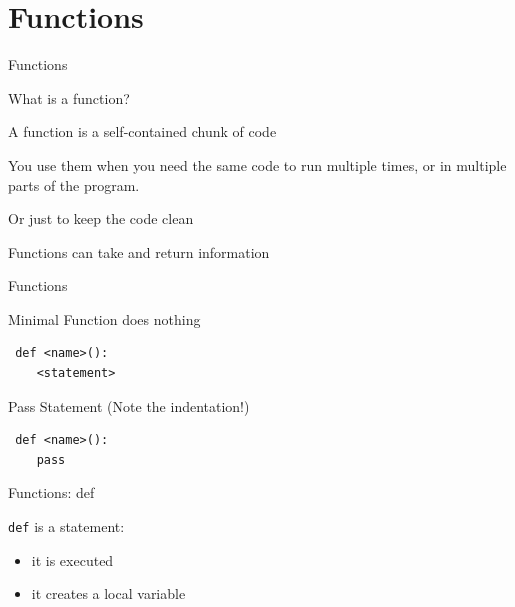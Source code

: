 \documentclass{beamer}
\begin{document}
\section{Functions}

\begin{frame}[fragile]{Functions}

\vfill
{\Large What is a function?}

\vfill
{\large A function is a self-contained chunk of code}

\vfill
{\large You use them when you need the same code to run multiple times,
or in multiple parts of the program.}

\hspace{1in}{\Large (DRY) }

\vfill
{\large Or just to keep the code clean}

\vfill
{\large Functions can take and return information}

\end{frame}


\begin{frame}[fragile]{Functions}

{\Large Minimal Function does nothing}

\begin{verbatim}
￼def <name>():
    <statement>
\end{verbatim}

\vspace{0.25in}
{\Large Pass Statement (Note the indentation!)}
\begin{verbatim}
￼def <name>():
    pass
\end{verbatim}


\end{frame}

\begin{frame}[fragile]{Functions: def}

{\large \verb+def+ is a statement:}
\begin{itemize}
  \item it is executed
  \item it creates a local variable
\end{itemize}

\vspace{0.2in}{\large￼function defs must be executed before the functions can be called}

\pause
\vspace{0.2in}{\large￼functions call functions -- this makes a stack -- that's all a trace back is}

\end{frame}
\end{document}
